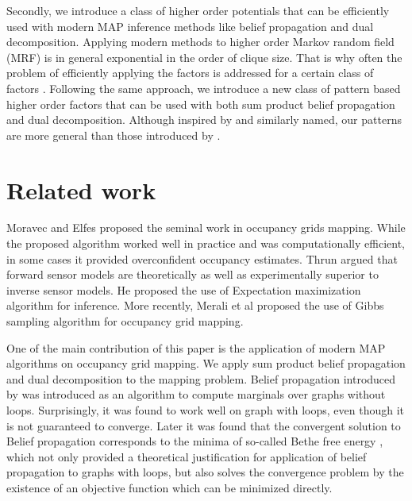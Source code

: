 \documentclass[letterpaper, 10 pt, conference]{ieeeconf} %
\begin{document}
Secondly, we introduce a class of higher
order potentials that can be efficiently used with modern MAP inference 
methods like belief propagation and dual decomposition. Applying 
modern methods to higher order Markov random field (MRF) is in general
exponential in the order of clique size.
That is why often the problem of efficiently applying the factors is addressed
for a certain class of factors 
\cite{komodakis2009beyond,leonardis2006efficient,potetz2007efficient}.
Following the same approach, we introduce a new class of pattern based higher
order factors that can be used with both sum product belief propagation and
dual decomposition. Although inspired by \cite{komodakis2009beyond} and
similarly named, our patterns are more general than those introduced by
\cite{komodakis2009beyond}.

\section{Related work}
Moravec and Elfes \cite{elfes1989using,moravec1988sensor,moravec1985high} 
proposed the
seminal work in occupancy grids mapping. While the proposed algorithm worked
well in practice and was computationally efficient, in some cases it provided
overconfident occupancy estimates. Thrun \cite{thrun2003learning} argued that
forward sensor models are theoretically as well as experimentally superior to 
inverse sensor models. He proposed the use of Expectation maximization
algorithm for inference. More recently, Merali et al \cite{merali2013icra}
proposed the use of Gibbs sampling algorithm for occupancy grid mapping.

One of the main contribution of this paper is the application of modern MAP
algorithms on occupancy grid mapping. We apply sum product belief propagation 
\cite{kschischang2001factor} and dual decomposition
\cite{sontag2011introduction} to the mapping problem. Belief propagation
introduced by \cite{pearl1986fusion} was introduced as an algorithm to compute
marginals over graphs without loops.  Surprisingly, it was found to work well
on graph with loops, even though it is not guaranteed to converge. Later it
was found that the convergent solution to Belief propagation corresponds to
the minima of so-called Bethe free energy \cite{yedidia2000generalized}, which
not only provided a theoretical justification for application of belief
propagation to graphs with loops, but also solves the convergence problem by 
the existence of an objective function which can be minimized directly.
\end{document}
